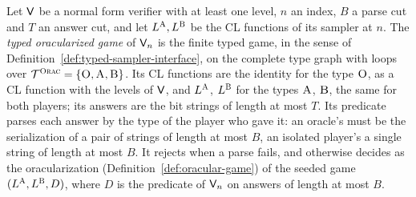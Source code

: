 \begin{definition}
\label{def:oracular-typed-game}
\leanok
Let $\mathsf{V}$ be a normal form verifier with at least one level, $n$ an index, $B$ a parse cut
and $T$ an answer cut, and let $L^{\textsc{A}}, L^{\textsc{B}}$ be the CL functions of its sampler at $n$. The
\emph{typed oracularized game} of $\mathsf{V}_n$ is the finite typed game, in the sense of
Definition~\ref{def:typed-sampler-interface}, on the complete type graph with loops over
$\mathcal{T}^{\textsc{Orac}} = \{\textsc{O}, \textsc{A}, \textsc{B}\}$. Its CL functions are the identity for the type
$\textsc{O}$, as a CL function with the levels of $\mathsf{V}$, and $L^{\textsc{A}}$, $L^{\textsc{B}}$ for the types
$\textsc{A}$, $\textsc{B}$, the same for both players; its answers are the bit strings of length at most $T$.
Its predicate parses each answer by the type of the player who gave it: an oracle's must be the
serialization of a pair of strings of length at most $B$, an isolated player's a single string of
length at most $B$. It rejects when a parse fails, and otherwise decides as the oracularization
(Definition~\ref{def:oracular-game}) of the seeded game $(L^{\textsc{A}}, L^{\textsc{B}}, D)$, where $D$ is the
predicate of $\mathsf{V}_n$ on answers of length at most $B$.
\end{definition}

